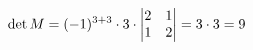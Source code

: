 \documentclass[preview]{standalone}
\begin{document}
\begin{align*}
\special{dvisvgm:raw <g id='unique000'>}\det M=(-1)^{3+3}\cdot 3\cdot\begin{vmatrix}2&1\\1&2\end{vmatrix}=3\cdot 3=9\special{dvisvgm:raw </g>}
\end{align*}
\end{document}
